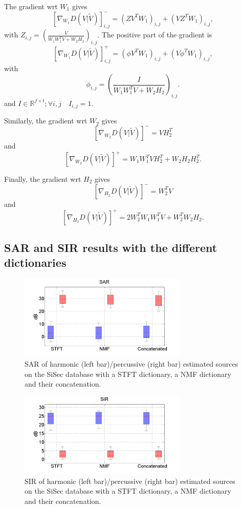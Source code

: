 The gradient wrt $W_1$ gives
$$[\nabla_{W_1} D(V|\tilde{V})]_{i,j}^{-} = (ZV^TW_1)_{i,j} + (VZ^TW_1)_{i,j},$$
with $Z_{i,j} = (\frac{V}{W_1W_1^TV + W_2H_2})_{i,j}$. 
The positive part of the gradient is
$$[\nabla_{W_1} D(V|\tilde{V})]_{i,j}^{+} = (\phi V^TW_1)_{i,j} + (V \phi^T W_1)_{i,j},$$
with $$ \phi_{i,j} = (\frac{I}{W_1W_1^TV + W_2H_2})_{i,j}.$$ and $I \in \mathbb{R}^{f \times t} ; \forall i,j \quad I_{i,j}=1$.


Similarly, the gradient wrt $W_2$ gives
$$ [\nabla_{W_2} D(V|\tilde{V})]^{-} = VH_2^T $$
and
$$ [\nabla_{W_2} D(V|\tilde{V})]^{+} = W_1W_1^TVH_2^T + W_2H_2H_2^T.$$

Finally, the gradient wrt $H_2$ gives
$$ [\nabla_{H_2} D(V|\tilde{V})]^{-} = W_2^TV  $$
and
$$ [\nabla_{H_2} D(V|\tilde{V})]^{+} = 2W_2^TW_1W_1^TV + W_2^TW_2H_2. $$



\subsection{SAR and SIR results with the different dictionaries}
\label{appendix:dict}

\begin{figure}[H]
  \centering 
  \includegraphics[width=8cm]{fig/DictSAR}
  \caption{\label{resultsDictSAR} SAR of harmonic (left bar)/percussive (right bar) estimated sources on the SiSec database with a STFT dictionary, a NMF dictionary and their concatenation.}
\end{figure}

\begin{figure}[H]
  \centering 
  \includegraphics[width=8cm]{fig/DictSIR}
  \caption{\label{resultsDictSIR} SIR of harmonic (left bar)/percussive (right bar) estimated sources on the SiSec database with a STFT dictionary, a NMF dictionary and their concatenation.}
\end{figure}

